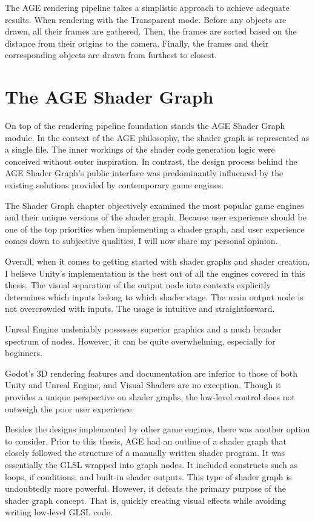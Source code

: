 \documentclass[
  digital,     %
  oneside,     %
  nosansbold,  %
  nocolorbold, %
  lof,         %
  lot,         %
]{fithesis4}
\begin{document}
The AGE rendering pipeline takes a simplistic approach to achieve adequate results.
When rendering with the Transparent mode. Before any objects are drawn,
all their frames are gathered. Then, the frames are sorted based on the distance
from their origins to the camera. Finally, the frames and their corresponding objects are drawn
from furthest to closest.

\chapter{The AGE Shader Graph}
On top of the rendering pipeline foundation stands the AGE Shader Graph module.
In the context of the AGE philosophy, the shader graph is represented as a single file.
The inner workings of the shader code generation logic were conceived without outer inspiration.
In contrast, the design process behind the AGE Shader Graph's public interface was predominantly influenced
by the existing solutions provided by contemporary game engines.

The Shader Graph chapter objectively examined the most popular game engines and their unique versions of the shader graph.
Because user experience should be one of the top priorities when implementing a shader graph, and user experience
comes down to subjective qualities, I will now share my personal opinion.

Overall, when it comes to getting started with shader graphs and shader creation, I believe Unity's implementation
is the best out of all the engines covered in this thesis. The visual separation of the output node into contexts
explicitly determines which inputs belong to which shader stage.
The main output node is not overcrowded with inputs.
The usage is intuitive and straightforward.

Unreal Engine undeniably possesses superior graphics and a much broader spectrum of nodes. However, it can
be quite overwhelming, especially for beginners.

Godot's 3D rendering features and documentation are inferior to those of both Unity and Unreal Engine,
and Visual Shaders are no exception. Though it provides a unique perspective on shader graphs,
the low-level control does not outweigh the poor user experience.

Besides the designs implemented by other game engines, there was another option to consider.
Prior to this thesis, AGE had an outline
of a shader graph that closely followed the structure of a manually written shader program.
It was essentially the GLSL wrapped into graph nodes. It included constructs
such as loops, if conditions, and built-in shader outputs. This type of shader graph
is undoubtedly more powerful. However, it defeats the primary purpose of the shader graph concept.
That is, quickly creating visual effects while avoiding writing low-level GLSL code.
\end{document}
